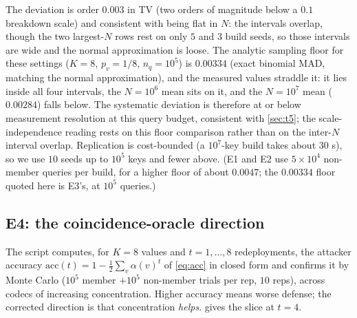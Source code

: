 \documentclass[sigconf,nonacm,anonymous,balance=false]{acmart}
\newcommand{\al}{\alpha}                    %
\begin{document}
The deviation is order $0.003$ in TV (two orders of magnitude below a $0.1$ breakdown
scale) and consistent with being flat in $N$: the intervals overlap, though the two
largest-$N$ rows rest on only $5$ and $3$ build seeds, so those intervals are wide and the
normal approximation is loose. The analytic sampling floor for these
settings ($K = 8$, $p_v = 1/8$, $n_q = 10^5$) is $0.00334$ (exact binomial MAD, matching
the normal approximation), and the measured values straddle it: it lies inside all four
intervals, the $N = 10^6$ mean sits on it, and the $N = 10^7$ mean ($0.00284$) falls
below. The systematic deviation is therefore at or below measurement resolution at this
query budget, consistent with \cref{sec:t5}; the scale-independence reading rests on this
floor comparison rather than on the inter-$N$ interval overlap. Replication is cost-bounded
(a $10^7$-key build takes about $30$ s), so we use $10$ seeds up to $10^5$ keys and fewer
above. (E1 and E2 use $5 \times 10^4$ non-member queries per build, for a higher floor of
about $0.0047$; the $0.00334$ floor quoted here is E3's, at $10^5$ queries.)

\subsection{E4: the coincidence-oracle direction}

The script computes, for $K = 8$ values and $t = 1, \dots, 8$ redeployments, the attacker
accuracy $\mathrm{acc}(t) = 1 - \tfrac12 \sum_v \al(v)^t$ of \eqref{eq:acc} in closed form
and confirms it by Monte Carlo ($10^5$ member $+ 10^5$ non-member trials per rep, $10$
reps), across codecs of increasing concentration. Higher accuracy means worse defense; the
corrected direction is that concentration \emph{helps}.  gives the slice at
$t = 4$.

\begin{table}[t]
  \centering
  \caption{E4: coincidence-oracle attacker accuracy at $t = 4$, by codec concentration.
  Accuracy falls monotonically as the codec concentrates: uniform is the unique worst
  defense, the most-concentrated codec the best. Monte Carlo matches the closed form in
  every cell (within a $95\%$ interval, or one binomial standard error near saturation),
  validating $\mathrm{acc}(t) = 1 - S(t)/2$.}
  \label{tab:e4}
\end{table}
\end{document}
